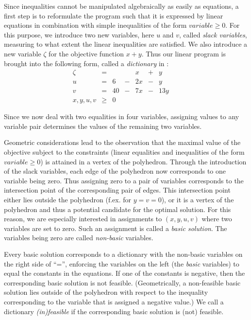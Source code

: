 \documentclass[ukenglish]{nik}
\begin{document}
Since inequalities cannot be manipulated algebraically as easily
as equations, a first step is to reformulate the program such that it is expressed
by linear equations in combination with simple inequalities of the form
$\mathit{variable}\geq 0$. For this purpose, we introduce
two new variables, here $u$ and $v$, called \emph{slack variables}, 
measuring to what extent the linear inequalities are satisfied. 
We also introduce a new variable $\zeta$
for the objective function $x+y$. 
Thus our linear program is brought into the following form, 
called a \emph{dictionary} in \cite{Vanderbei}:
\[    
    \begin{array}{lcrcrcrcr}
      \zeta&=&   & &     x &+&     y & &  \\\hline
      u    &=& 6 &-&   2 x &-&     y & &  \\
      v    &=& 40&-&   7 x &-&  13 y & &  \\
      x,y,u,v  &\geq&0     & &  & &  & &    
    \end{array}
\]

Since we now deal with two equalities in four variables, 
assigning values to any variable pair determines the values of the remaining two variables.

Geometric considerations lead to the observation that the
maximal value of the objective subject to the constraints (linear
equalities and inequalities of the form 
$\mathit{variable}\geq 0$) is attained in a vertex of the polyhedron. 
Through the introduction of the slack variables, each edge of the polyhedron now corresponds to one variable
being zero. Thus assigning zero to a pair of variables corresponds to the intersection point of the corresponding pair of edges. 
This intersection point either lies outside the polyhedron (f.ex. for $y=v=0$), or  
it is a vertex of the polyhedron and thus a potential candidate for the optimal solution. 
For this reason, we are especially interested in assignments to $(x,y,u,v)$ where two variables are set to zero. 
Such an assignment is called a \emph{basic solution}. The variables being zero are called \emph{non-basic} variables.

Every basic solution corresponds to a dictionary with the non-basic variables on the right side of ``='', 
enforcing the variables on the left (the \emph{basic} variables) to equal the constants in the equations. 
If one of the constants is negative, then the corresponding basic solution is not feasible. 
(Geometrically, a non-feasible basic solution lies outside of the polyhedron with respect to 
the inequality corresponding to the variable that is assigned a negative value.)
We  call a dictionary \emph{(in)feasible} if the corresponding basic solution is (not) feasible.
\end{document}
